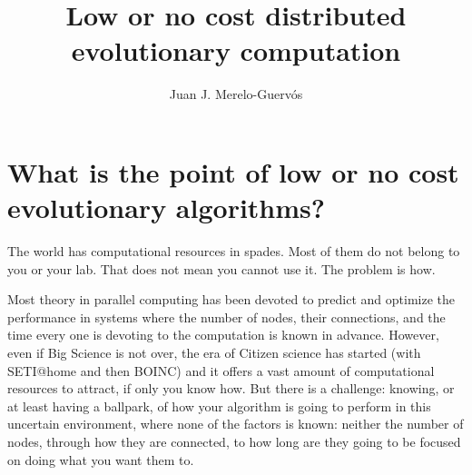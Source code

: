 \documentclass{svmult}
\begin{document}
\title*{Low or no cost distributed evolutionary computation}
\author{Juan J. Merelo-Guerv\'os}


\maketitle


\section{What is the point of low or no cost evolutionary algorithms?}

The world has computational resources in spades. Most of them do not belong to you or your lab. That does not mean you cannot use it. The problem is how.

Most theory in parallel computing has been devoted to predict and optimize the performance in systems where the number of nodes, their connections, and the time every one is devoting to the computation is known in advance. However, even if Big Science is not over, the era of Citizen science has started (with SETI@home and then BOINC) and it offers a vast amount of computational resources to attract, if only you know how. But there is a challenge: knowing, or at least having a ballpark, of how your algorithm is going to perform in this uncertain environment, where none of the factors is known: neither the number of nodes, through how they are connected, to how long are they going to be focused on doing what you want them to.
\end{document}
